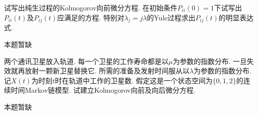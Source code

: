 \begin{problem}{3.30}
试写出纯生过程的Kolmogorov向前微分方程. 在初始条件$P_{ii}(0) = 1$下试写出$P_{ii}(t)$及$P_{ij}(t)$应满足的方程. 特别对$\lambda_j = j\lambda$的Yule过程求出$P_{ij}(t)$的明显表达式.
\end{problem}
\begin{solution}
	本题暂缺
\end{solution}

\begin{problem}{3.31}
两个通讯卫星放入轨道. 每一个卫星的工作寿命都是以$\mu$为参数的指数分布. 一旦失效就再放射一颗新卫星替换它. 所需的准备及发射时间服从以$\lambda$为参数的指数分布. 记$X(t)$为时刻$t$时在轨道中工作的卫星数. 假定这是一个状态空间为$\{0,1,2\}$的连续时间Markov链模型. 试建立Kolmogorov向前及向后微分方程.
\end{problem}
\begin{solution}
	本题暂缺
\end{solution}